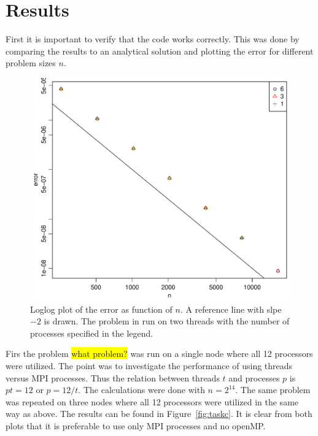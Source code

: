 \section{Results}
%
First it is important to verify that the code works correctly. This was done by comparing the results to an analytical solution and plotting the error for different problem sizes $n$. 
\begin{figure}[h!]
\begin{center}
    \includegraphics[scale=0.5]{./Figures/errVsn.pdf}
\end{center}
\caption{Loglog plot of the error as function of $n$. A reference line with slpe $-2$ is drawn. The problem in run on two threads with the number of processes specified in the legend.}
\label{fig:errVsn}
\end{figure}
%
Firs the problem \colorbox{yellow}{what problem?} was run on a single node where all 12 processors were utilized. The point was to investigate the performance of using threads versus MPI processes. Thus the relation between threads $t$ and processes $p$ is $p t = 12$ or $p = 12/t$. The calculations were done with $n = 2^{14}$. 
The same problem was repeated on three nodes where all 12 processors were utilized in the same way as above. The results can be found in Figure~\ref{fig:taskc}. It is clear from both plots that it is preferable to use only MPI processes and no openMP. 

